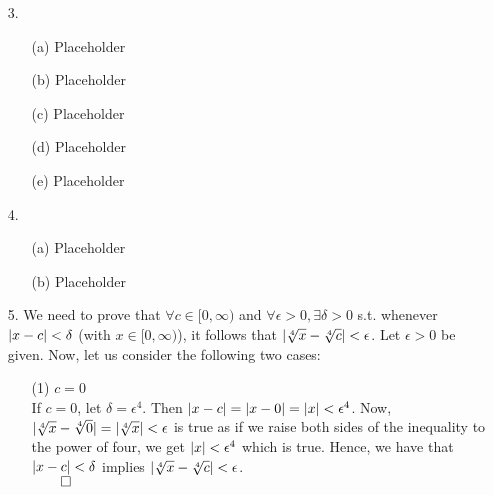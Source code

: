 \documentclass[11pt]{article}
\DeclarePairedDelimiter\abs{\lvert}{\rvert}%
\begin{document}
\begin{itemize}
    \item[3.]
        \begin{itemize}
            \item[(a)]
                Placeholder

            \item[(b)]
                Placeholder

            \item[(c)]
                Placeholder

            \item[(d)]
                Placeholder

            \item[(e)]
                Placeholder
        \end{itemize}

    \item[4.]
        \begin{itemize}
            \item[(a)]
                Placeholder

            \item[(b)]
                Placeholder
        \end{itemize}

    \newpage

    \item[5.]
        We need to prove that $\forall c \in [0, \infty)$ and
        $\forall \epsilon > 0, \exists \delta > 0$ s.t. whenever
        $\abs{x - c} < \delta$ (with $x \in [0, \infty)$), it follows that
        $\abs{\sqrt[4]{x} - \sqrt[4]{c}} < \epsilon$.
        Let $\epsilon > 0$ be given. Now, let us consider the following two
        cases:
        \begin{itemize}
            \item[(1)]
                $c = 0$\\
                If $c = 0$, let $\delta = \epsilon^4$. Then
                $\abs{x - c} = \abs{x - 0} = \abs{x} < \epsilon^4$.
                Now,
                $\abs{\sqrt[4]{x} - \sqrt[4]{0}} = \abs{\sqrt[4]{x}} < \epsilon$
                is true as if we raise both sides of the inequality to the
                power of four, we get $\abs{x} < \epsilon^4$ which is true.
                Hence, we have that $\abs{x - c} < \delta$ implies
                $\abs{\sqrt[4]{x} - \sqrt[4]{c}} < \epsilon$.\\
                $\qed$


\end{itemize}
\end{itemize}
\end{document}
